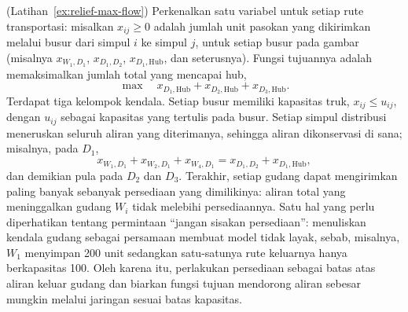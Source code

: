 \begin{solution}(Latihan~\ref{ex:relief-max-flow})
Perkenalkan satu variabel untuk setiap rute transportasi: misalkan $x_{ij} \geq 0$ adalah jumlah unit pasokan yang dikirimkan melalui busur dari simpul $i$ ke simpul $j$, untuk setiap busur pada gambar (misalnya $x_{W_1,D_1}$, $x_{D_1,D_2}$, $x_{D_1,\text{Hub}}$, dan seterusnya). Fungsi tujuannya adalah memaksimalkan jumlah total yang mencapai hub,
\[
\max \quad x_{D_1,\text{Hub}} + x_{D_2,\text{Hub}} + x_{D_3,\text{Hub}}.
\]
Terdapat tiga kelompok kendala. Setiap busur memiliki kapasitas truk, $x_{ij} \leq u_{ij}$, dengan $u_{ij}$ sebagai kapasitas yang tertulis pada busur. Setiap simpul distribusi meneruskan seluruh aliran yang diterimanya, sehingga aliran dikonservasi di sana; misalnya, pada $D_1$,
\[
x_{W_1,D_1} + x_{W_2,D_1} + x_{W_4,D_1} = x_{D_1,D_2} + x_{D_1,\text{Hub}},
\]
dan demikian pula pada $D_2$ dan $D_3$. Terakhir, setiap gudang dapat mengirimkan paling banyak sebanyak persediaan yang dimilikinya: aliran total yang meninggalkan gudang $W_i$ tidak melebihi persediaannya.
Satu hal yang perlu diperhatikan tentang permintaan ``jangan sisakan persediaan'': menuliskan kendala gudang sebagai persamaan membuat model tidak layak, sebab, misalnya, $W_1$ menyimpan 200 unit sedangkan satu-satunya rute keluarnya hanya berkapasitas 100. Oleh karena itu, perlakukan persediaan sebagai batas atas aliran keluar gudang dan biarkan fungsi tujuan mendorong aliran sebesar mungkin melalui jaringan sesuai batas kapasitas.
\end{solution}

